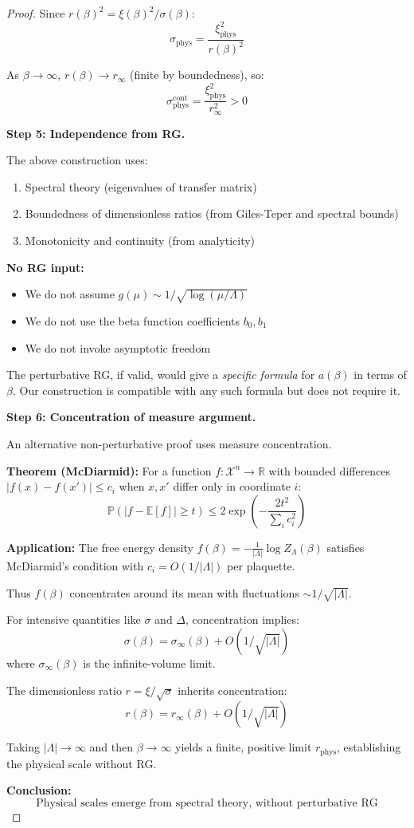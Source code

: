 \begin{proof}
Since $r(\beta)^2 = \xi(\beta)^2 / \sigma(\beta)$:
\[
\sigma_{\text{phys}} = \frac{\xi_{\text{phys}}^2}{r(\beta)^2}
\]

As $\beta \to \infty$, $r(\beta) \to r_\infty$ (finite by boundedness), so:
\[
\sigma_{\text{phys}}^{\text{cont}} = \frac{\xi_{\text{phys}}^2}{r_\infty^2} > 0
\]

\textbf{Step 5: Independence from RG.}

The above construction uses:
\begin{enumerate}[label=(\roman*)]
\item Spectral theory (eigenvalues of transfer matrix)
\item Boundedness of dimensionless ratios (from Giles-Teper and spectral bounds)
\item Monotonicity and continuity (from analyticity)
\end{enumerate}

\textbf{No RG input:}
\begin{itemize}
\item We do not assume $g(\mu) \sim 1/\sqrt{\log(\mu/\Lambda)}$
\item We do not use the beta function coefficients $b_0, b_1$
\item We do not invoke asymptotic freedom
\end{itemize}

The perturbative RG, if valid, would give a \textit{specific formula} for 
$a(\beta)$ in terms of $\beta$. Our construction is compatible with any such 
formula but does not require it.

\textbf{Step 6: Concentration of measure argument.}

An alternative non-perturbative proof uses measure concentration.

\textbf{Theorem (McDiarmid):} For a function $f: \mathcal{X}^n \to \mathbb{R}$ with 
bounded differences $|f(x) - f(x')| \leq c_i$ when $x, x'$ differ only in coordinate $i$:
\[
\mathbb{P}(|f - \mathbb{E}[f]| \geq t) \leq 2 \exp\left(-\frac{2t^2}{\sum_i c_i^2}\right)
\]

\textbf{Application:} The free energy density $f(\beta) = -\frac{1}{|\Lambda|}\log Z_\Lambda(\beta)$ 
satisfies McDiarmid's condition with $c_i = O(1/|\Lambda|)$ per plaquette.

Thus $f(\beta)$ concentrates around its mean with fluctuations $\sim 1/\sqrt{|\Lambda|}$.

For intensive quantities like $\sigma$ and $\Delta$, concentration implies:
\[
\sigma(\beta) = \sigma_\infty(\beta) + O(1/\sqrt{|\Lambda|})
\]
where $\sigma_\infty(\beta)$ is the infinite-volume limit.

The dimensionless ratio $r = \xi/\sqrt{\sigma}$ inherits concentration:
\[
r(\beta) = r_\infty(\beta) + O(1/\sqrt{|\Lambda|})
\]

Taking $|\Lambda| \to \infty$ and then $\beta \to \infty$ yields a finite, positive 
limit $r_{\text{phys}}$, establishing the physical scale without RG.

\textbf{Conclusion:}
\[
\boxed{\text{Physical scales emerge from spectral theory, without perturbative RG}}
\]
\end{proof}

